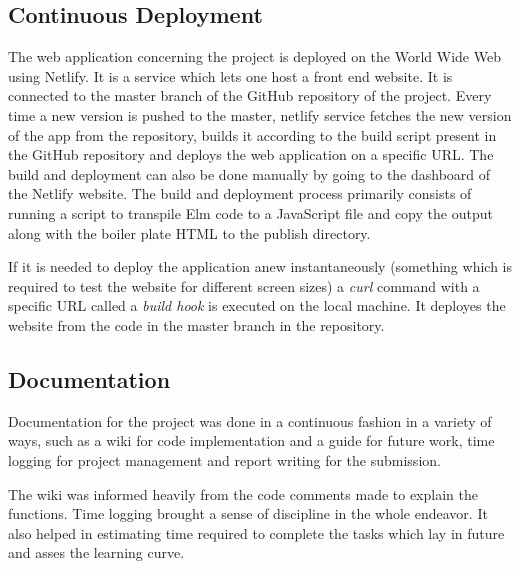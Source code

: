 \subsection{Continuous Deployment}
The web application concerning the project is deployed on the World Wide Web
using Netlify. It is a service which lets one host a front end website. It is
connected to the master branch of the GitHub repository of the project. Every
time a new version is pushed to the master, netlify service fetches the new
version of the app from the repository, builds it according to the build script
present in the GitHub repository and deploys the web application on a specific
URL. The build and deployment can also be done manually by going to the
dashboard of the Netlify website. The build and deployment process primarily
consists of running a script to transpile Elm code to a JavaScript file and copy
the output along with the boiler plate HTML to the publish directory.

If it is needed to deploy the application anew instantaneously (something which
is required to test the website for different screen sizes) a \emph{curl}
command with a specific URL called a \emph{build hook} is executed on the local
machine.  It deployes the website from the code in the master branch in the
repository.


\subsection{Documentation}
Documentation for the project was done in a continuous fashion in a variety of
ways, such as a wiki for code implementation and a guide for future work, time
logging for project management and report writing for the submission. 

The wiki was informed heavily from the code comments made to explain the
functions. Time logging brought a sense of discipline in the whole endeavor.
It also helped in estimating time required to complete the tasks which lay in
future and asses the learning curve.
